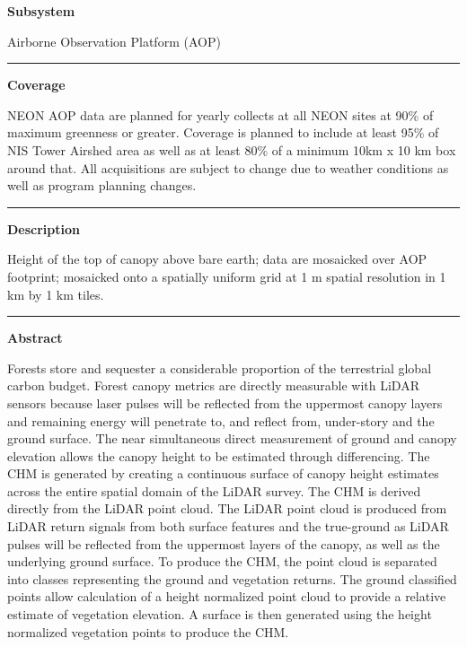 \documentclass[]{article}
\begin{document}
\textbf{Subsystem}

Airborne Observation Platform (AOP)

\begin{center}\rule{0.5\linewidth}{\linethickness}\end{center}

\textbf{Coverage}

NEON AOP data are planned for yearly collects at all NEON sites at 90\%
of maximum greenness or greater. Coverage is planned to include at least
95\% of NIS Tower Airshed area as well as at least 80\% of a minimum
10km x 10 km box around that. All acquisitions are subject to change due
to weather conditions as well as program planning changes.

\begin{center}\rule{0.5\linewidth}{\linethickness}\end{center}

\textbf{Description}

Height of the top of canopy above bare earth; data are mosaicked over
AOP footprint; mosaicked onto a spatially uniform grid at 1 m spatial
resolution in 1 km by 1 km tiles.

\begin{center}\rule{0.5\linewidth}{\linethickness}\end{center}

\textbf{Abstract}

Forests store and sequester a considerable proportion of the terrestrial
global carbon budget. Forest canopy metrics are directly measurable with
LiDAR sensors because laser pulses will be reflected from the uppermost
canopy layers and remaining energy will penetrate to, and reflect from,
under-story and the ground surface. The near simultaneous direct
measurement of ground and canopy elevation allows the canopy height to
be estimated through differencing. The CHM is generated by creating a
continuous surface of canopy height estimates across the entire spatial
domain of the LiDAR survey. The CHM is derived directly from the LiDAR
point cloud. The LiDAR point cloud is produced from LiDAR return signals
from both surface features and the true-ground as LiDAR pulses will be
reflected from the uppermost layers of the canopy, as well as the
underlying ground surface. To produce the CHM, the point cloud is
separated into classes representing the ground and vegetation returns.
The ground classified points allow calculation of a height normalized
point cloud to provide a relative estimate of vegetation elevation. A
surface is then generated using the height normalized vegetation points
to produce the CHM.
\end{document}
